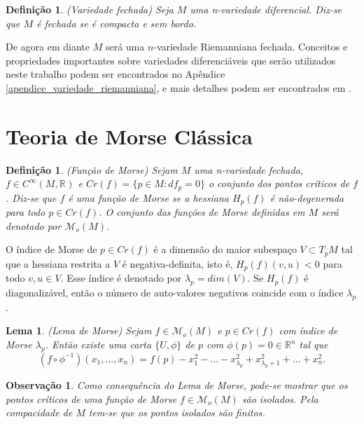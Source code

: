 \documentclass[12pt]{book}
\newtheorem{lema}[teorema]{Lema}
\newtheorem{definicao}[teorema]{Definição}
\newtheorem{observacao}[teorema]{Observação}
\newcommand{\funcoesmorse}[1]{\mathcal{M}_{o}(#1)}
\newcommand{\funcoessuaves}[1]{C^{\infty}(#1, \real{})}
\newcommand{\pontoscriticos}[1]{\textit{Cr}(#1)}
\newcommand{\real}[1]{\mathbb{R}^{#1}}
\begin{document}
	\begin{definicao}\label{definicao_variedade_fechada}
		(Variedade fechada) Seja $M$ uma n-variedade diferencial. Diz-se que $M$ é fechada se é compacta e sem bordo.
	\end{definicao}
	
	De agora em diante $M$ será uma $n$-variedade Riemanniana fechada. Conceitos e propriedades importantes sobre variedades diferenciáveis que serão utilizados neste trabalho podem ser encontrados no Apêndice \ref{apendice_variedade_riemanniana}, e mais detalhes podem ser encontrados em \cite{manfredo_riemannian_geo}.
	
	\section{Teoria de Morse Clássica}\label{secao_morse_classica}
	
	\begin{definicao}
		(Função de Morse) Sejam $M$ uma n-variedade fechada, $f \in \funcoessuaves{M}$ e $\pontoscriticos{f} = \{p \in M: df_{p} = 0\}$ o conjunto dos pontos críticos de $f$. Diz-se que $f$ é uma função de Morse se a hessiana $H_{p}(f)$ é não-degenerada para todo $p \in \pontoscriticos{f}$. O conjunto das funções de Morse definidas em $M$ será denotado por $\funcoesmorse{M}$. 
	\end{definicao}

	O índice de Morse de $p \in \pontoscriticos{f}$ é a dimensão do maior subespaço $V\subset T_{p}M $ tal que a hessiana restrita a $V$ é negativa-definita, isto é, $H_{p}(f)(v,u)<0$ para todo $v,u \in V$. Esse índice é denotado por $\lambda_{p} = dim(V)$. Se $H_{p}(f)$ é diagonalizável, então o número de auto-valores negativos coincide com o índice $\lambda_{p}$.
	
	\begin{lema}
		(Lema de Morse) Sejam $f \in \funcoesmorse{M}$ e $p \in \pontoscriticos{f}$ com índice de Morse $\lambda_{p}$. Então existe uma carta $\{U, \phi\}$ de $p$ com $\phi(p)=0 \in \real{n}$ tal que 
		$$
		(f\circ \phi^{-1})(x_{1}, \dots, x_{n}) = f(p)-x_{1}^{2}-\dots -x^{2}_{\lambda_{p}}+x^{2}_{\lambda_{p}+1}+\dots + x^{2}_{n}.
		$$
	\end{lema}
	
	\begin{observacao}
		Como consequência do Lema de Morse, pode-se mostrar que os pontos críticos de uma função de Morse $f \in \funcoesmorse{M}$ são isolados. Pela compacidade de $M$ tem-se que os pontos isolados são finitos.
	\end{observacao}
	
\end{document}
